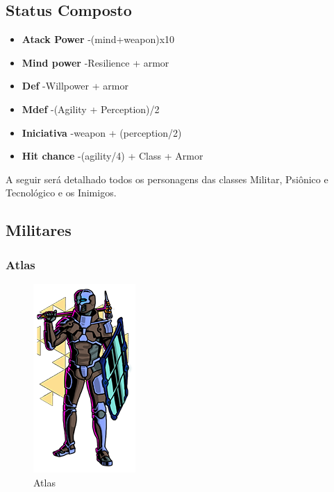 \documentclass[11pt]{article} %
\begin{document}
\subsection{Status Composto}

\begin {itemize}
  \item \textbf{Atack Power} -(mind+weapon)x10 
  \item \textbf{Mind power} -Resilience + armor 
  \item \textbf{Def} -Willpower + armor 
  \item \textbf{Mdef} -(Agility + Perception)/2 
  \item \textbf{Iniciativa} -weapon + (perception/2) 
  \item \textbf{Hit chance} -(agility/4) + Class + Armor 
\end {itemize}

A seguir será detalhado todos os personagens das classes Militar, Psiônico e Tecnológico e os Inimigos.

\subsection{Militares}

\subsubsection{Atlas}

\begin{figure}[!htp]
\centering
\includegraphics[scale=0.5]{res/characters/Atlas.png}
\caption{Atlas}
\label{Atlas}
\end{figure}
\end{document}
